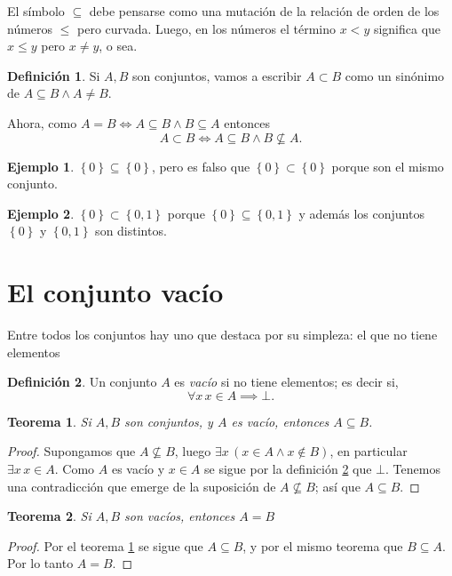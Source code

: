 \documentclass{book}
\newcommand{\set}[1]{\left\lbrace #1 \right\rbrace }
\newtheorem{thm}{Teorema}[chapter]
\theoremstyle{definition}
\newtheorem{df}{Definición}[chapter]
\newtheorem{ejm}{Ejemplo}[chapter]
\begin{document}
El símbolo $\subseteq$ debe pensarse como una mutación de la relación de orden de los números $\leq$ pero curvada.
Luego, en los números el término $x<y$ significa que $x\leq y$ pero $x \neq y$, o sea. 

\begin{df}
	Si $A,B$ son conjuntos, vamos a escribir $A \subset B$ como un sinónimo de $A \subseteq B \wedge A \neq B$.
\end{df}
Ahora, como $A = B \iff A \subseteq B \wedge B \subseteq A$ entonces
\begin{equation*}
	A \subset B \iff A \subseteq B \wedge B \not \subseteq A.
\end{equation*}

\begin{ejm}
	$\set{0} \subseteq \set{0}$, pero es falso que $\set{0} \subset \set{0}$ porque son el mismo conjunto.
\end{ejm}

\begin{ejm}
	$\set{0} \subset \set{0,1}$ porque $\set{0} \subseteq \set{0,1}$ y además los conjuntos $\set{0}$ y $\set{0,1}$ son distintos.
\end{ejm}

\section{El conjunto vacío}
Entre todos los conjuntos hay uno que destaca por su simpleza: el que no tiene elementos

\begin{df}\label{df_vacio}
	Un conjunto $A$ es \emph{vacío} si no tiene elementos; es decir si,
	\[\forall x\, x\in A \implies \bot.\]
\end{df}

\begin{thm}\label{thm_vacioContenido}
	Si $A,B$ son conjuntos, y $A$ es vacío, entonces $A\subseteq B$.
\end{thm}
\begin{proof}
	Supongamos que $A \not \subseteq B$, luego $\exists x\, \left(x\in A \wedge x \notin B \right)$, en particular $\exists x\, x\in A$.
	Como $A$ es vacío y $x\in A$ se sigue por la definición \ref{df_vacio} que $\bot$. 
	Tenemos una contradicción que emerge de la suposición de $A \not\subseteq B$; así que $A \subseteq B$.
\end{proof}
\begin{thm}
	Si $A,B$ son vacíos, entonces $A=B$
\end{thm}
\begin{proof}
	Por el teorema \ref{thm_vacioContenido} se sigue que $A\subseteq B$, y por el mismo teorema que $B\subseteq A$.
	Por lo tanto $A=B$.
\end{proof}
\end{document}
